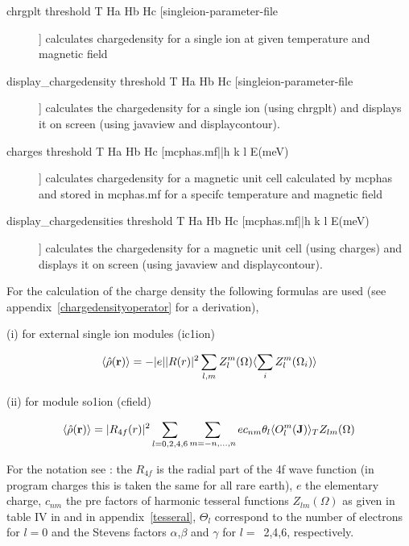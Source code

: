 \begin{description} 
\item [chrgplt  threshold T Ha Hb Hc [singleion-parameter-file]]
 calculates chargedensity for a single ion at given temperature and magnetic field
\item [display\_chargedensity  threshold T Ha Hb Hc [singleion-parameter-file]]
 calculates the chargedensity for a single ion (using {\prg chrgplt})
 and displays it on screen (using {\prg javaview} and {\prg displaycontour}).
\item [charges threshold T Ha Hb Hc [mcphas.mf||h k l E(meV)]]
 calculates chargedensity for a magnetic unit cell calculated by {\prg mcphas} and
 stored in {\prg mcphas.mf} for a specifc temperature and magnetic field
\item [display\_chargedensities threshold T Ha Hb Hc [mcphas.mf||h k l E(meV)]]
 calculates the chargedensity for a magnetic unit cell (using {\prg charges})
 and displays it on screen (using {\prg javaview} and {\prg displaycontour}).
\end{description}

   For the calculation of the charge density the following formulas are used (see %
appendix~\ref{chargedensityoperator} for a derivation), 

(i) for external single ion modules ({\prg ic1ion})
   
  \begin{equation}\label{chargedensity}
	       \langle \hat\rho(\mathbf r)\rangle=
	       -|e|  |R(r)|^2 \sum_{l,m}Z_l^{m}(\Omega) \langle\sum_i Z_l^{m}(\Omega_i)\rangle
   \end{equation} 
  
(ii) for module {\prg so1ion} ({\prg cfield})
   
   \begin{equation}\label{chargedensity_operator}
	       \langle \hat\rho(\mathbf r)\rangle=|R_{4f}(r)|^2 \sum_{l=0,2,4,6}\sum_{m=-n,...,n}
	       e  c_{nm} \theta_{l} \langle O_l^m(\mathbf J)\rangle_T Z_{lm}(\Omega)
	      \end{equation}
		  
For the notation see \cite{hutchings64-227}: the $R_{4f}$ is the radial part of the
4f wave function (in program {\prg charges} this is taken the same for all
rare earth), $e$ the elementary charge, $c_{nm}$ the pre factors of harmonic tesseral
functions $Z_{lm}(\Omega)$ as given in table IV in \cite{hutchings64-227} and in appendix~\ref{tesseral}, %
$\Theta_l$
correspond to the number of electrons for $l=0$
 and the Stevens factors $\alpha$,$\beta$ and $\gamma$ for $l=$~2,4,6, respectively.

